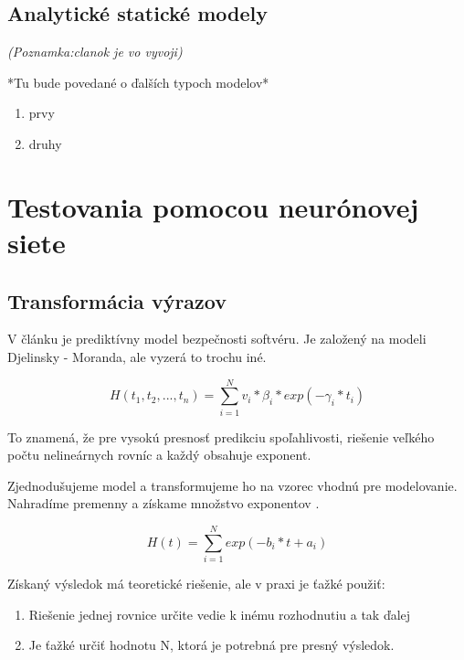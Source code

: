 \documentclass[10pt,twoside,slovak,a4paper]{article}
\begin{document}
\subsection{Analytické statické modely} \label{ASM}

\textit{ (Poznamka:clanok je vo vyvoji)}

*Tu bude povedané o ďalších typoch modelov*
\begin{enumerate}
\item prvy
\item druhy
\end{enumerate}

\section{Testovania pomocou neurónovej siete} \label{MM a NS}

\subsection{Transformácia výrazov} \label{TV}

V článku \cite{kabak1984reability} je prediktívny model bezpečnosti softvéru. Je založený na modeli Djelinsky - Moranda, ale vyzerá to trochu iné.

\begin{equation}\label{}
H(t_1,t_2,...,t_n) = \sum \limits_{i=1}^{N} v_i*\beta_i *exp(-\gamma_i * t_i)
 \end{equation}
 
 To znamená, že pre vysokú presnosť predikciu spoľahlivosti, riešenie veľkého počtu nelineárnych rovníc a každý obsahuje exponent.
 
 Zjednodušujeme model a transformujeme ho na vzorec vhodnú pre modelovanie. Nahradíme premenny a získame množstvo exponentov \cite{kabak1984reability}.
 
 \begin{equation}\label{formula4}
H(t) = \sum \limits_{i=1}^{N} exp(-b_i * t + a_i)
 \end{equation}
 
 Získaný výsledok má teoretické riešenie, ale v praxi je ťažké použiť:
 
 \begin{enumerate}
\item Riešenie jednej rovnice určite vedie k inému rozhodnutiu a tak ďalej
\item Je ťažké určiť hodnotu N, ktorá je potrebná pre presný výsledok.
\end{enumerate}
 
\end{document}
